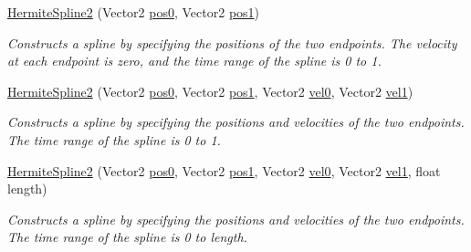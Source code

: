 \begin{DoxyCompactItemize}
\item 
\mbox{\hyperlink{struct_leap_1_1_unity_1_1_animation_1_1_hermite_spline2_af2e4cf32921a5a73855a36d6fa562567}{Hermite\+Spline2}} (Vector2 \mbox{\hyperlink{struct_leap_1_1_unity_1_1_animation_1_1_hermite_spline2_a34b8ac4e587d68ca8a12eb4bd0b49173}{pos0}}, Vector2 \mbox{\hyperlink{struct_leap_1_1_unity_1_1_animation_1_1_hermite_spline2_a208182486711483ef684285a1df65fc7}{pos1}})
\begin{DoxyCompactList}\small\item\em Constructs a spline by specifying the positions of the two endpoints. The velocity at each endpoint is zero, and the time range of the spline is 0 to 1. \end{DoxyCompactList}\item 
\mbox{\hyperlink{struct_leap_1_1_unity_1_1_animation_1_1_hermite_spline2_abd39b804bfee316f451049c8617a8594}{Hermite\+Spline2}} (Vector2 \mbox{\hyperlink{struct_leap_1_1_unity_1_1_animation_1_1_hermite_spline2_a34b8ac4e587d68ca8a12eb4bd0b49173}{pos0}}, Vector2 \mbox{\hyperlink{struct_leap_1_1_unity_1_1_animation_1_1_hermite_spline2_a208182486711483ef684285a1df65fc7}{pos1}}, Vector2 \mbox{\hyperlink{struct_leap_1_1_unity_1_1_animation_1_1_hermite_spline2_a14cb5f29c619abcd0cb6d11ba3fb6b40}{vel0}}, Vector2 \mbox{\hyperlink{struct_leap_1_1_unity_1_1_animation_1_1_hermite_spline2_a430d3b4dfb7c08fbaff770671eb42eb4}{vel1}})
\begin{DoxyCompactList}\small\item\em Constructs a spline by specifying the positions and velocities of the two endpoints. The time range of the spline is 0 to 1. \end{DoxyCompactList}\item 
\mbox{\hyperlink{struct_leap_1_1_unity_1_1_animation_1_1_hermite_spline2_a54a32a6e8f4c7a873beda463b5f61657}{Hermite\+Spline2}} (Vector2 \mbox{\hyperlink{struct_leap_1_1_unity_1_1_animation_1_1_hermite_spline2_a34b8ac4e587d68ca8a12eb4bd0b49173}{pos0}}, Vector2 \mbox{\hyperlink{struct_leap_1_1_unity_1_1_animation_1_1_hermite_spline2_a208182486711483ef684285a1df65fc7}{pos1}}, Vector2 \mbox{\hyperlink{struct_leap_1_1_unity_1_1_animation_1_1_hermite_spline2_a14cb5f29c619abcd0cb6d11ba3fb6b40}{vel0}}, Vector2 \mbox{\hyperlink{struct_leap_1_1_unity_1_1_animation_1_1_hermite_spline2_a430d3b4dfb7c08fbaff770671eb42eb4}{vel1}}, float length)
\begin{DoxyCompactList}\small\item\em Constructs a spline by specifying the positions and velocities of the two endpoints. The time range of the spline is 0 to length. \end{DoxyCompactList}\item 

\end{DoxyCompactItemize}
